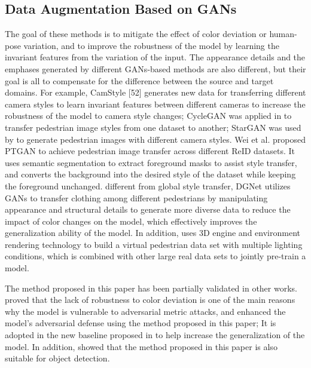 \documentclass[10pt,twocolumn,letterpaper]{article}
\begin{document}
\subsection{Data Augmentation Based on GANs}	
The goal of these methods is to mitigate the effect of color deviation or human-pose variation, and to improve the robustness of the model by learning the invariant features from the variation of the input. The appearance details and the emphases generated by different GANs-based methods are also different, but their goal is all to compensate for the difference between the source and target domains. For example, CamStyle [52] generates new data for transferring different camera styles to learn invariant features between different cameras to increase the robustness of the model to camera style changes; CycleGAN\cite{zhu2017unpaired} was applied in\cite{deng2018image,zhong2019invariance} to transfer pedestrian image styles from one dataset to another; StarGAN\cite{choi2018stargan} was used by\cite{zhong2018generalizing} to generate pedestrian images with different camera styles. Wei et al.\cite{wei2018person} proposed PTGAN to achieve pedestrian image transfer across different ReID datasets. It uses semantic segmentation to extract foreground masks to assist style transfer, and converts the background into the desired style of the dataset while keeping the foreground unchanged. different from global style transfer, DGNet\cite{zheng2019joint} utilizes GANs to transfer clothing among different pedestrians by manipulating appearance and structural details to generate more diverse data to reduce the impact of color changes on the model, which effectively improves the generalization ability of the model. In addition,\cite{bak2018domain} uses 3D engine and environment rendering technology to build a virtual pedestrian data set with multiple lighting conditions, which is combined with other large real data sets to jointly pre-train a model.

The method proposed in this paper has been partially validated in other works. \cite{Gong_2022_CVPR} proved that the lack of robustness to color deviation is one of the main reasons why the model is vulnerable to adversarial metric attacks\cite{bouniot2020vulnerability,bai2019metric,wang2020transferable}, and enhanced the model's adversarial defense using the method proposed in this paper; It is adopted in the new baseline proposed in\cite{ni2021flipreid,chen2021benchmarks} to help increase the generalization of the model. In addition, \cite{ryu2021detection} showed that the method proposed in this paper is also suitable for object detection.
\end{document}
